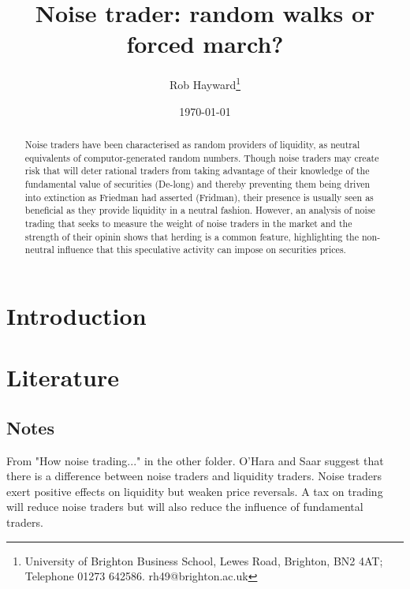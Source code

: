 \documentclass[12pt, a4paper, oneside]{article}\usepackage[]{graphicx}\usepackage[]{color}
\begin{document}
\title{Noise trader: random walks or forced march?}
\author{Rob Hayward\footnote{University of Brighton Business School, Lewes Road, Brighton, BN2 4AT; Telephone 01273 642586.  rh49@brighton.ac.uk}}
\date{\today}
\maketitle
\begin{abstract}
Noise traders have been characterised as random providers of liquidity, as neutral equivalents of computor-generated random numbers.  Though noise traders may create risk that will deter rational traders from taking advantage of their knowledge of the fundamental value of securities (De-long) and thereby preventing them being driven into extinction as Friedman had asserted (Fridman), their presence  is usually seen as beneficial as they provide liquidity in a neutral fashion.  However, an analysis of noise trading that seeks to measure the weight of noise traders in the market and the strength of their opinin shows that herding is a common feature, highlighting the non-neutral influence that this speculative activity can impose on securities prices. 
\end{abstract}

\section{Introduction}
\section{Literature}
\subsection{Notes}
From "How noise trading..." in the other folder. 
O'Hara and Saar suggest that there is a difference between noise traders and liquidity traders.  Noise traders exert positive effects on liquidity but weaken price reversals. A tax on trading will reduce noise traders but will also reduce the influence of fundamental traders. 
\end{document}
